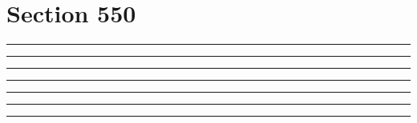 \documentclass[11pt,a4paper]{article}
\begin{document}
\section{Section 550}
\begin{swarmwrap}%
  \begin{minipage}[t]{4cm}
    \centering
    \textcolor{red!20}{\rule{\linewidth}{3cm}}
  \end{minipage}%
\end{swarmwrap}%
\swarmwrapnext\lipsum[1]\lipsum[2]\lipsum[3]\lipsum[4]\lipsum[5]
\begin{swarmwrap}%
  \begin{minipage}[t]{5cm}
    \centering
    \textcolor{red!20}{\rule{\linewidth}{4cm}}
  \end{minipage}%
\end{swarmwrap}%
\swarmwrapnext\lipsum[1]\lipsum[2]\lipsum[3]\lipsum[4]\lipsum[5]\lipsum[6]
\begin{swarmwrap}%
  \begin{minipage}[t]{2cm}
    \centering
    \textcolor{red!20}{\rule{\linewidth}{5cm}}
  \end{minipage}%
\end{swarmwrap}%
\swarmwrapnext\lipsum[1]
\begin{swarmwrap}%
  \begin{minipage}[t]{3cm}
    \centering
    \textcolor{red!20}{\rule{\linewidth}{6cm}}
  \end{minipage}%
\end{swarmwrap}%
\swarmwrapnext\lipsum[1]\lipsum[2]
\begin{swarmwrap}%
  \begin{minipage}[t]{4cm}
    \centering
    \textcolor{red!20}{\rule{\linewidth}{7cm}}
  \end{minipage}%
\end{swarmwrap}%
\swarmwrapnext\lipsum[1]\lipsum[2]\lipsum[3]
\begin{swarmwrap}%
  \begin{minipage}[t]{5cm}
    \centering
    \textcolor{red!20}{\rule{\linewidth}{8cm}}
  \end{minipage}%
\end{swarmwrap}%
\swarmwrapnext\lipsum[1]\lipsum[2]\lipsum[3]\lipsum[4]
\begin{swarmwrap}%
  \begin{minipage}[t]{2cm}
    \centering
    \textcolor{red!20}{\rule{\linewidth}{9cm}}
  \end{minipage}%
\end{swarmwrap}%
\end{document}
